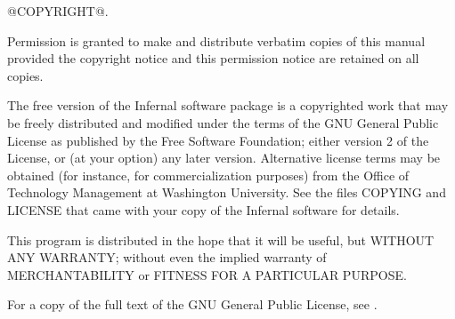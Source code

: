 \vspace*{\fill}
\begin{flushleft}
@COPYRIGHT@.\vspace{5mm}

Permission is granted to make and distribute verbatim copies of this
manual provided the copyright notice and this permission notice are
retained on all copies.\vspace{5mm}

The free version of the Infernal software package is a copyrighted
work that may be freely distributed and modified under the terms of
the GNU General Public License as published by the Free Software
Foundation; either version 2 of the License, or (at your option) any
later version. Alternative license terms may be obtained (for
instance, for commercialization purposes) from the Office of
Technology Management at Washington University. See the files COPYING
and LICENSE that came with your copy of the Infernal software for
details.\vspace{5mm}

This program is distributed in the hope that it will be useful, but
WITHOUT ANY WARRANTY; without even the implied warranty of
MERCHANTABILITY or FITNESS FOR A PARTICULAR PURPOSE.\vspace{5mm}

For a copy of the full text of the GNU General Public License, see
.
\vspace{5mm}

\end{flushleft}
